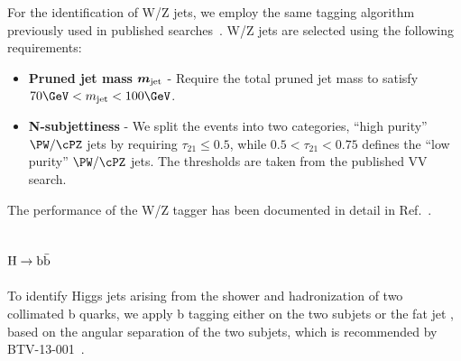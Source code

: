 For the identification of W/Z jets, we employ the same tagging algorithm 
previously used in published 
searches~\cite{CMS:2013fea}.  W/Z jets are selected using the following
requirements:
\begin{itemize}

\item {\bf Pruned jet mass}  $\mbox{\boldmath$m_{\text{jet}}$}$
  - Require the total pruned jet mass to satisfy $70 \GeVcc < m_\text{jet} <  100 \GeVcc $.

\item {\bf N-subjettiness} 
  - We split the events into two categories, ``high purity'' $\PW/\cPZ$ jets by
    requiring $\tau_{21} \leq 0.5$, while $ 0.5 < \tau_{21} < 0.75$ defines 
    the ``low purity'' $\PW/\cPZ$ jets.  The thresholds are taken from the published VV
    search.

\end{itemize}
The performance of the W/Z tagger has been documented in detail in Ref.~\cite{JME-13-006}.















\subsection{${\rm H \to b\bar{b}}$}
\label{sec:higgsTaggerbb}

To identify Higgs jets arising from the shower and hadronization of two 
collimated b quarks, we apply b tagging either on the two subjets or the
fat jet , based on the angular separation of the two subjets, which is 
recommended by BTV-13-001~\cite{BTV-13-001}. 

